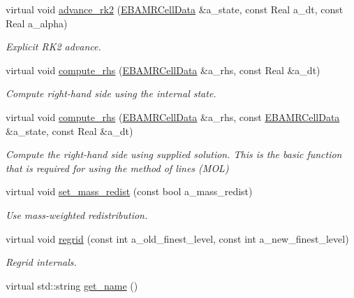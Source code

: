 \begin{DoxyCompactItemize}
virtual void \hyperlink{classcdr__solver_ac74b78131bffd03ff42a8588961a36e7}{advance\+\_\+rk2} (\hyperlink{type__definitions_8H_a7e610f301989e5e07781c5e338bdb7c3}{E\+B\+A\+M\+R\+Cell\+Data} \&a\+\_\+state, const Real a\+\_\+dt, const Real a\+\_\+alpha)
\begin{DoxyCompactList}\small\item\em Explicit R\+K2 advance. \end{DoxyCompactList}\item 
virtual void \hyperlink{classcdr__solver_afaf734b003f9f590d2d28d22bea5b13d}{compute\+\_\+rhs} (\hyperlink{type__definitions_8H_a7e610f301989e5e07781c5e338bdb7c3}{E\+B\+A\+M\+R\+Cell\+Data} \&a\+\_\+rhs, const Real \&a\+\_\+dt)
\begin{DoxyCompactList}\small\item\em Compute right-\/hand side using the internal state. \end{DoxyCompactList}\item 
virtual void \hyperlink{classcdr__solver_ad2a88993922ba91dbe884504cef9e92b}{compute\+\_\+rhs} (\hyperlink{type__definitions_8H_a7e610f301989e5e07781c5e338bdb7c3}{E\+B\+A\+M\+R\+Cell\+Data} \&a\+\_\+rhs, const \hyperlink{type__definitions_8H_a7e610f301989e5e07781c5e338bdb7c3}{E\+B\+A\+M\+R\+Cell\+Data} \&a\+\_\+state, const Real \&a\+\_\+dt)
\begin{DoxyCompactList}\small\item\em Compute the right-\/hand side using supplied solution. This is the basic function that is required for using the method of lines (M\+OL) \end{DoxyCompactList}\item 
virtual void \hyperlink{classcdr__solver_aa4c657b762132b576281f75ca2b92ef6}{set\+\_\+mass\+\_\+redist} (const bool a\+\_\+mass\+\_\+redist)
\begin{DoxyCompactList}\small\item\em Use mass-\/weighted redistribution. \end{DoxyCompactList}\item 
virtual void \hyperlink{classcdr__solver_a211e80cc1d679362c82ff7f782cba9b2}{regrid} (const int a\+\_\+old\+\_\+finest\+\_\+level, const int a\+\_\+new\+\_\+finest\+\_\+level)
\begin{DoxyCompactList}\small\item\em Regrid internals. \end{DoxyCompactList}\item 
virtual std\+::string \hyperlink{classcdr__solver_a7c348df5e678fdef064dbd85e8d8cfe4}{get\+\_\+name} ()

\end{DoxyCompactItemize}
